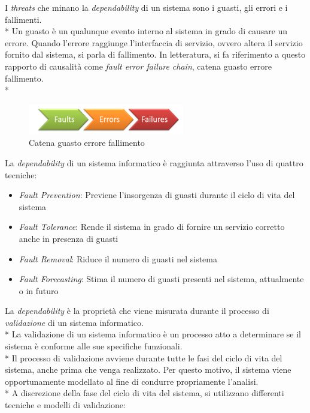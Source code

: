 I \emph{threats} che minano la \emph{dependability} di un sistema sono i guasti, gli errori e i fallimenti.\\*
Un guasto \`e un qualunque evento interno al sistema in grado di causare un errore. Quando l'errore raggiunge l'interfaccia di servizio, ovvero altera il servizio fornito dal sistema, si parla di fallimento. In letteratura, si fa riferimento a questo rapporto di causalit\`a come \emph{fault error failure chain}, catena guasto errore fallimento.\\*
\begin{figure}[h]
	\centering
	\includegraphics[width=0.7\linewidth]{img/gefpng}
	\caption{Catena guasto errore fallimento}
	\label{fig:gefpng}
\end{figure}\newpage
La \emph{dependability} di un sistema informatico \`e raggiunta attraverso l'uso di quattro tecniche:
\begin{itemize}
	\item \emph{Fault Prevention}: Previene l'insorgenza di guasti durante il ciclo di vita del sistema
	\item \emph{Fault Tolerance}: Rende il sistema in grado di fornire un servizio corretto anche in presenza di guasti
	\item \emph{Fault Removal}: Riduce il numero di guasti nel sistema
	\item \emph{Fault Forecasting}: Stima il numero di guasti presenti nel sistema, attualmente o in futuro
\end{itemize}
La \emph{dependability} \`e la propriet\`a che viene misurata durante il processo di \emph{validazione} di un sistema informatico.\\*
La validazione di un sistema informatico \`e un processo atto a determinare se il sistema \`e conforme alle sue specifiche funzionali.\\*
Il processo di validazione avviene durante tutte le fasi del ciclo di vita del sistema, anche prima che venga realizzato. Per questo motivo, il sistema viene opportunamente modellato al fine di condurre propriamente l'analisi.\\*
A discrezione della fase del ciclo di vita del sistema, si utilizzano differenti tecniche e modelli di validazione: \cite{librobonda}
